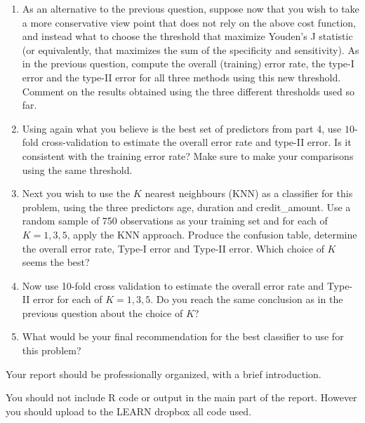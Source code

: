 \documentclass[11pt]{article}
\begin{document}
\begin{enumerate}
  \item As an alternative to the previous question, suppose now that you wish to take a more conservative view point that does not rely on the above cost function, and instead what to choose the threshold that maximize Youden's J statistic (or equivalently, that maximizes the sum of the specificity and sensitivity). As in the previous question, compute the overall (training) error rate, the type-I error and the type-II error for all three methods using this new threshold. Comment on the results obtained using the three different thresholds used so far.
\item Using again what you believe is the best set of predictors from part 4, use $10$-fold cross-validation to estimate the overall error rate and  type-II error. Is it consistent with the training error rate?   Make sure to make your comparisons using the same threshold. 
\item Next you wish to use the $K$ nearest neighbours (KNN) as a classifier for this problem, using the three predictors age, duration and credit\_amount. Use a random sample of 750 observations as your training set and for each of $K=1,3,5$, apply the KNN approach. Produce the confusion table, determine the overall error rate, Type-I error and Type-II error. Which choice of $K$ seems the best?
  \item Now use 10-fold cross validation to estimate the overall error rate and Type-II error for each of $K=1,3,5$. Do you reach the same conclusion as in the previous question about the choice of $K$?
  \item What would be your final recommendation for the best classifier to use for this problem?
\end{enumerate}

Your report should be professionally organized, with a brief introduction.

You should not include R code or output in the main part of the report. However you should upload to the LEARN dropbox all code used.
\end{document}
